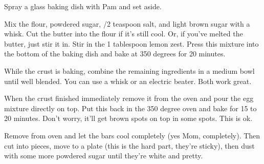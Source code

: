 \begin{IngredientsAndSteps}
    {}

    {}

    \ListIngredientsAndSteps[Assembly]
    {
    }
    {
        Spray a  glass baking dish with Pam and set aside.

        Mix the flour, powdered sugar, /2 teaspoon salt, and light brown sugar
        with a whisk. Cut the butter into the flour if it's still cool. Or, if you've melted
        the butter, just stir it in. Stir in the 1 tablespoon lemon zest. Press this mixture
        into the bottom of the baking dish and bake at 350 degrees for 20 minutes.

        While the crust is baking, combine the remaining ingredients in a medium bowl until
        well blended. You can use a whisk or an electric beater. Both work great.

        When the crust finished immediately remove it from the oven and pour the egg mixture
        directly on top. Put this back in the 350 degree oven and bake for 15 to 20 minutes. Don't
        worry, it'll get brown spots on top in some spots. This is ok.

        Remove from oven and let the bars cool completely (yes Mom, completely). Then cut into
         pieces, move to a plate (this is the hard part, they're sticky), then dust
        with some more powdered sugar until they're white and pretty.
    }
\end{IngredientsAndSteps}

%
%
%
%
\newpage

